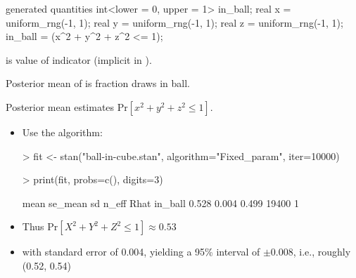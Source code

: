 \documentclass[10pt]{report}
\begin{document}

%
\begin{stancode}
generated quantities {
  int<lower = 0, upper = 1> in_ball;
  {
    real x = uniform_rng(-1, 1);
    real y = uniform_rng(-1, 1);
    real z = uniform_rng(-1, 1);
    in_ball = (x^2 + y^2 + z^2 <= 1);
  }
}
\end{stancode}
\begin{subitemize}
\item {} is value of indicator (implicit in \code{<=}).
\item Posterior mean of  is fraction draws in ball.
\item Posterior mean estimates $\mbox{Pr}[x^2 + y^2 + z^2 \leq 1]$.
\end{subitemize}

%
\begin{itemize}
\item Use the  algorithm:

\begin{stancode}
> fit <- stan("ball-in-cube.stan",
               algorithm="Fixed_param",
              iter=10000)

> print(fit, probs=c(), digits=3)

         mean se_mean    sd n_eff Rhat
in_ball 0.528   0.004 0.499 19400    1
\end{stancode}
\item Thus $\mbox{Pr}[X^2 + Y^2 + Z^2 \leq 1] \approx 0.53$
\item with standard error of 0.004, yielding a 95\% interval of $\pm
  0.008$, i.e., roughly (0.52, 0.54)
\end{itemize}
\end{document}
